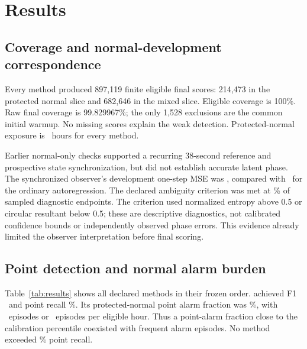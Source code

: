 \section{Results}
\label{sec:results}
\subsection{Coverage and normal-development correspondence}
Every method produced 897,119 finite eligible final scores: 214,473 in the protected normal slice and 682,646 in the mixed slice. Eligible coverage is 100\%. Raw final coverage is 99.829967\%; the only 1,528 exclusions are the common initial warmup. No missing scores explain the weak detection. Protected-normal exposure is \NormalHours\ hours for every method.

Earlier normal-only checks supported a recurring 38-second reference and prospective state synchronization, but did not establish accurate latent phase. The synchronized observer's development one-step MSE was \ObserverMSE, compared with \ARMSE\ for the ordinary autoregression. The declared ambiguity criterion was met at \AmbiguityPct\% of sampled diagnostic endpoints. The criterion used normalized entropy above 0.5 or circular resultant below 0.5; these are descriptive diagnostics, not calibrated confidence bounds or independently observed phase errors. This evidence already limited the observer interpretation before final scoring.

\subsection{Point detection and normal alarm burden}
Table~\ref{tab:results} shows all declared methods in their frozen order.  achieved F1 \RCFone\ and point recall \RCRecallPct\%. Its protected-normal point alarm fraction was \RCNormalPct\%, with \RCEpisodes\ episodes or \RCEpisodeRate\ episodes per eligible hour. Thus a point-alarm fraction close to the calibration percentile coexisted with frequent alarm episodes. No method exceeded \TemplateRecallPct\% point recall.

\begin{table}[htbp]\centering\scriptsize
\caption{Complete final comparison. Precision, recall, F1 and AP are fractions. Normal point alarms are percentages; episodes/h uses eligible protected-normal exposure. Hits are event overlaps out of eight. No scores are point-adjusted.}\label{tab:results}
\resizebox{\textwidth}{!}{}
\end{table}

